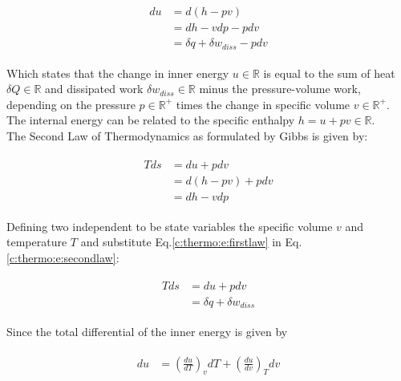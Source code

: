 \begin{align}
\begin{split}
du &= d \left( h - pv \right ) \\ &= dh - v dp - p dv \\
&= \delta q + \delta w_{diss} - p dv
\end{split}
\label{c:thermo:e:firstlaw}
\end{align}

Which states that the change in inner energy $u \in \mathbb{R}$ is equal to the sum of heat $\delta Q \in \mathbb{R}$ and dissipated work $\delta w_{diss} \in \mathbb{R}$ minus the pressure-volume work, depending on the pressure $p \in \mathbb{R}^+$ times the change in specific volume $v \in \mathbb{R}^+$. The internal energy can be related to the specific enthalpy $h = u +pv \in \mathbb{R}$.\\

The Second Law of Thermodynamics as formulated by Gibbs \cite[p.59]{Struchtrup2014} is given by:

\begin{align}
\begin{split}
T ds &= du + p dv \\
 &= d( h - pv ) + p dv \\
 &= dh - vdp
\end{split}
\label{c:thermo:e:secondlaw}
\end{align}

Defining two independent to be state variables the specific volume $v$ and temperature $T$ and substitute Eq.\ref{c:thermo:e:firstlaw} in Eq.\ref{c:thermo:e:secondlaw}:

\begin{align}
\begin{split}
T ds &= du + p dv \\
&= \delta q  + \delta w_{diss}
\end{split}
\label{c:thermo:e:firstandsecondlaw}
\end{align}

Since the total differential of the inner energy is given by


\begin{align}
\begin{split}
du &= \left( \frac{du}{dT} \right)_v dT  + \left( \frac{du}{dv} \right)_T dv
\end{split}
\label{c:thermo:e:innerenergydiff}
\end{align}

